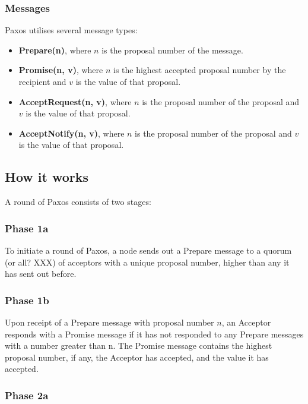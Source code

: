 \documentclass[12pt,twoside,notitlepage]{report}
\begin{document}
\subsubsection*{Messages}

Paxos utilises several message types:

\begin{itemize}
\item {\bf Prepare(n)}, where $n$ is the proposal number of the message.
\item {\bf Promise(n, v)}, where $n$ is the highest accepted proposal number by the recipient and
	$v$ is the value of that proposal.
\item {\bf AcceptRequest(n, v)}, where $n$ is the proposal number of the proposal and $v$ is the
	value of that proposal.
\item {\bf AcceptNotify(n, v)}, where $n$ is the proposal number of the proposal and $v$ is the value
	of that proposal.
\end{itemize}

\subsection{How it works}

A round of Paxos consists of two stages:

\subsubsection*{Phase 1a}

To initiate a round of Paxos, a node sends out a Prepare message to a quorum (or all? XXX) of
acceptors with a unique proposal number, higher than any it has sent out before.

\subsubsection*{Phase 1b}

Upon receipt of a Prepare message with proposal number $n$, an Acceptor responds with a Promise
message if it has not responded to any Prepare messages with a number greater than n. The Promise
message contains the highest proposal number, if any, the Acceptor has accepted, and the value it
has accepted.

\subsubsection*{Phase 2a}
\end{document}
